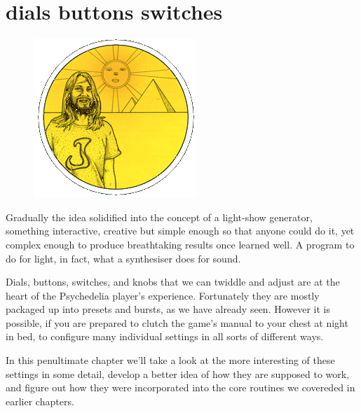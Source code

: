 \chapter{dials buttons switches} 
\label{sec:dials}
\begin{definition}
\setlength{\intextsep}{0pt}%
\setlength{\columnsep}{3pt}%
\begin{figure}
\includegraphics[width=\linewidth]{src/callout/psych.png} 
\end{figure}
\small
Gradually the idea solidified into the concept of a
light-show generator, something interactive, creative but simple
enough so that anyone could do it, yet complex enough to produce
breathtaking results once learned well. A program to do for light, in
fact, what a synthesiser does for sound.
\end{definition}

Dials, buttons, switches, and knobs that we can twiddle and adjust are at the heart of the 
Psychedelia player's experience. Fortunately they are mostly packaged up into presets and bursts,
as we have already seen. However it is possible, if you are prepared to clutch the game's manual
to your chest at night in bed, to configure many individual settings in all sorts of different ways.

In this penultimate chapter we'll take a look at the more interesting of these settings in some detail, develop
a better idea of how they are supposed to work, and figure out how they were incorporated into the core routines
we covereded in earlier chapters.

